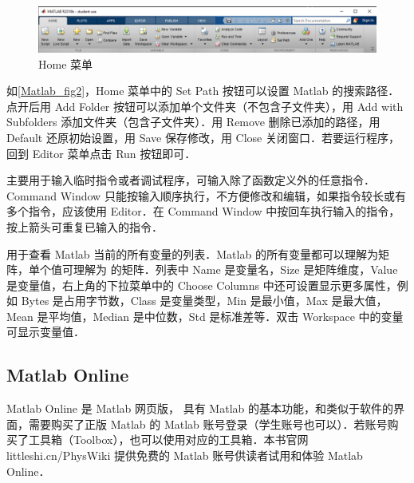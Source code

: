 \begin{figure}[ht]
\centering
\includegraphics[width= 14cm]{./figures/Matlab2.png}
\caption{Home 菜单}\label{Matlab_fig2}
\end{figure}

如\autoref{Matlab_fig2}，Home 菜单中的 Set Path 按钮可以设置 Matlab 的搜索路径．点开后用 Add Folder 按钮可以添加单个文件夹（不包含子文件夹），用 Add with Subfolders 添加文件夹（包含子文件夹）．用 Remove 删除已添加的路径，用 Default 还原初始设置，用 Save 保存修改，用 Close 关闭窗口．若要运行程序，回到 Editor 菜单点击 Run 按钮即可．

 主要用于输入临时指令或者调试程序，可输入除了函数定义外的任意指令．Command Window 只能按输入顺序执行，不方便修改和编辑，如果指令较长或有多个指令，应该使用 Editor．在 Command Window 中按回车执行输入的指令，按上箭头可重复已输入的指令．

 用于查看 Matlab 当前的所有变量的列表．Matlab 的所有变量都可以理解为矩阵，单个值可理解为  的矩阵．列表中 Name 是变量名，Size 是矩阵维度，Value 是变量值，右上角的下拉菜单中的 Choose Columns 中还可设置显示更多属性，例如 Bytes 是占用字节数，Class 是变量类型，Min 是最小值，Max 是最大值，Mean 是平均值，Median 是中位数，Std 是标准差等．双击 Workspace 中的变量可显示变量值．

\subsection{Matlab Online}
Matlab Online 是 Matlab 网页版， 具有 Matlab 的基本功能，和类似于软件的界面，需要购买了正版 Matlab 的 Matlab 账号登录（学生账号也可以）．若账号购买了工具箱（Toolbox），也可以使用对应的工具箱．本书官网 littleshi.cn/PhysWiki 提供免费的 Matlab 账号供读者试用和体验 Matlab Online．

